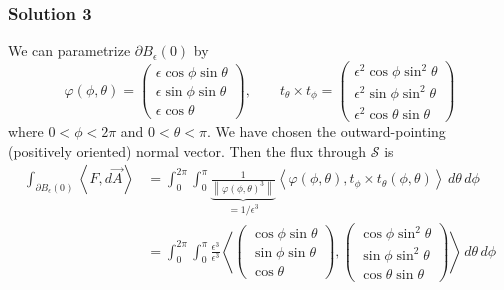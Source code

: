 \documentclass[10pt, t, allowdisplaybreaks]{beamer}
\begin{document}
\begin{frame}
    \frametitle{Solution 3}
    \par  We can parametrize $\partial B_\epsilon(0)$ by 
    \begin{equation*}
        \varphi(\phi, \theta) = \begin{pmatrix}
            \epsilon \cos \phi \sin \theta\\
            \epsilon \sin\phi \sin\theta\\
            \epsilon\cos\theta
        \end{pmatrix}, \qquad
        t_\theta\times t_\phi = \begin{pmatrix}
            \epsilon^2\cos\phi\sin^2\theta\\
            \epsilon^2\sin\phi\sin^2\theta\\
            \epsilon^2\cos\theta\sin\theta
        \end{pmatrix}
    \end{equation*}
    where $0<\phi<2\pi$ and $0<\theta<\pi$. We have chosen the outward-pointing (positively oriented) normal vector. Then the flux through $\mathcal{S}$ is 
    \begin{equation*}
        \begin{split}
            \int_{\partial B_\epsilon(0)}\left\langle F, d\overrightarrow{A} \right\rangle 
            &= \int^{2\pi}_0\int^\pi_0\underbrace{\frac{1}{\left\lVert \varphi(\phi,\theta)^3\right\rVert }}_{=1/\epsilon^3}\left\langle \varphi(\phi, \theta), t_\phi\times t_\theta(\phi, \theta)\right\rangle \,d\theta\,d\phi\\
            &= \int^{2\pi}_0\int^\pi_0 \frac{\epsilon^3}{\epsilon^3}\left\langle \begin{pmatrix}
                 \cos \phi \sin \theta\\
                 \sin\phi \sin\theta\\
                \cos\theta
            \end{pmatrix}, \begin{pmatrix}
                \cos\phi\sin^2\theta\\
                \sin\phi\sin^2\theta\\
                \cos\theta\sin\theta
            \end{pmatrix}\right\rangle \,d\theta\,d\phi\\
        \end{split}
    \end{equation*}
\end{frame}
\end{document}
